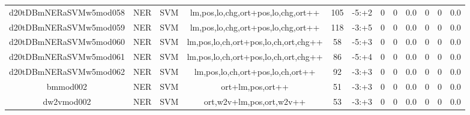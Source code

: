 \documentclass[a4paper]{article}
\begin{document}
\begin{landscape}
\begin{center}
\begin{tabular}{ |c|c|c|c|c|c|c|c|c|c|c|c|}
 
 	
 	\small{ d20tDBmNERaSVMw5mod058 } & \small{ NER} & \small{  SVM }  & lm,pos,lo,chg,ort+pos,lo,chg,ort++  &  105 &  \small{  -5:+2 }  &  0 & 0 & 0.0  &  0 & 0 & 0.0 \\
 	

 
 	
 	\small{ d20tDBmNERaSVMw5mod059 } & \small{ NER} & \small{  SVM }  & lm,pos,lo,chg,ort+pos,lo,chg,ort++  &  118 &  \small{  -3:+5 }  &  0 & 0 & 0.0  &  0 & 0 & 0.0 \\
 	

 
 	
 	\small{ d20tDBmNERaSVMw5mod060 } & \small{ NER} & \small{  SVM }  & lm,pos,lo,ch,ort+pos,lo,ch,ort,chg++  &  58 &  \small{  -5:+3 }  &  0 & 0 & 0.0  &  0 & 0 & 0.0 \\
 	

 
 	
 	\small{ d20tDBmNERaSVMw5mod061 } & \small{ NER} & \small{  SVM }  & lm,pos,lo,ch,ort+pos,lo,ch,ort,chg++  &  86 &  \small{  -5:+4 }  &  0 & 0 & 0.0  &  0 & 0 & 0.0 \\
 	

 
 	
 	\small{ d20tDBmNERaSVMw5mod062 } & \small{ NER} & \small{  SVM }  & lm,pos,lo,ch,ort+pos,lo,ch,ort++  &  92 &  \small{  -3:+3 }  &  0 & 0 & 0.0  &  0 & 0 & 0.0 \\
 	

 
 	
 	\small{ bmmod002 } & \small{ NER} & \small{  SVM }  & ort+lm,pos,ort++  &  51 &  \small{  -3:+3 }  &  0 & 0 & 0.0  &  0 & 0 & 0.0 \\
 	

 
 	
 	\small{ dw2vmod002 } & \small{ NER} & \small{  SVM }  & ort,w2v+lm,pos,ort,w2v++  &  53 &  \small{  -3:+3 }  &  0 & 0 & 0.0  &  0 & 0 & 0.0 \\
 	

 
 \hline
\end{tabular}
\end{center}

\end{landscape}
\end{document}
